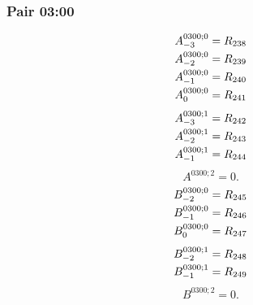 \documentclass[11pt,a4paper]{article}
\begin{document}
\subsubsection{Pair 03:00}
\begin{equation}
\shortstack[l]{$\displaystyle A^{0300;0}_{-3}=R_{238}$\\
$\displaystyle A^{0300;0}_{-2}=R_{239}$\\
$\displaystyle A^{0300;0}_{-1}=R_{240}$\\
$\displaystyle A^{0300;0}_{0}=R_{241}$}
\label{eq:cat-map-216}
\end{equation}
\begin{equation}
\shortstack[l]{$\displaystyle A^{0300;1}_{-3}=R_{242}$\\
$\displaystyle A^{0300;1}_{-2}=R_{243}$\\
$\displaystyle A^{0300;1}_{-1}=R_{244}$}
\label{eq:cat-map-217}
\end{equation}
\begin{equation}
A^{0300;2}=0.
\label{eq:cat-map-218}
\end{equation}
\begin{equation}
\shortstack[l]{$\displaystyle B^{0300;0}_{-2}=R_{245}$\\
$\displaystyle B^{0300;0}_{-1}=R_{246}$\\
$\displaystyle B^{0300;0}_{0}=R_{247}$}
\label{eq:cat-map-219}
\end{equation}
\begin{equation}
\shortstack[l]{$\displaystyle B^{0300;1}_{-2}=R_{248}$\\
$\displaystyle B^{0300;1}_{-1}=R_{249}$}
\label{eq:cat-map-220}
\end{equation}
\begin{equation}
B^{0300;2}=0.
\label{eq:cat-map-221}
\end{equation}
\end{document}
